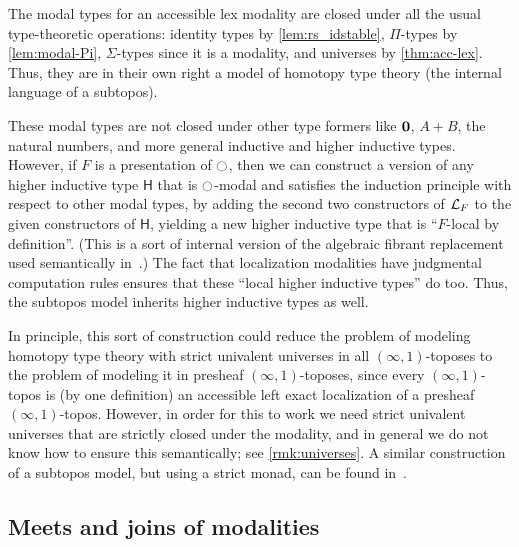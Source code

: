 \begin{rmk}\label{thm:subtopos-model}
  The modal types for an accessible lex modality are closed under all the usual type-theoretic operations: identity types by \cref{lem:rs_idstable}, $\Pi$-types by \cref{lem:modal-Pi}, $\Sigma$-types since it is a modality, and universes by \cref{thm:acc-lex}.
  Thus, they are in their own right a model of homotopy type theory (the internal language of a subtopos).

  These modal types are not closed under other type formers like $\mathbf{0}$, $A+B$, the natural numbers, and more general inductive and higher inductive types.
  However, if $F$ is a presentation of ${\ocircle}$, then we can construct a version of any higher inductive type $\mathsf{H}$ that is ${\ocircle}$-modal and satisfies the induction principle with respect to other modal types, by adding the second two constructors of $\mathcal{L}_{F}$ to the given constructors of $\mathsf{H}$, yielding a new higher inductive type that is ``$F$-local by definition''.
  (This is a sort of internal version of the algebraic fibrant replacement used semantically in~\cite{LumsdaineShulman}.)
  The fact that localization modalities have judgmental computation rules ensures that these ``local higher inductive types'' do too.
  Thus, the subtopos model inherits higher inductive types as well.

  In principle, this sort of construction could reduce the problem of modeling homotopy type theory with strict univalent universes in all $(\infty,1)$-toposes to the problem of modeling it in presheaf $(\infty,1)$-toposes, since every $(\infty,1)$-topos is (by one definition) an accessible left exact localization of a presheaf $(\infty,1)$-topos.
  However, in order for this to work we need strict univalent universes that are strictly closed under the modality, and in general we do not know how to ensure this semantically; see \cref{rmk:universes}.
  A similar construction of a subtopos model, but using a strict monad, can be found in~\cite{Stacks,Coquand:stack}.
\end{rmk}


\subsection{Meets and joins of modalities}
\label{sec:poset-modalities}

